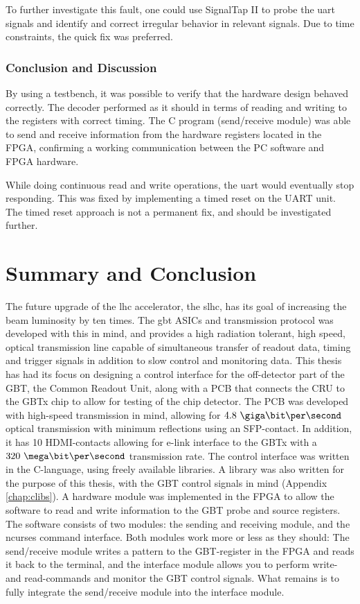 \documentclass[main.tex]{subfiles}
\begin{document}
To further investigate this fault, one could use SignalTap II to probe the \gls{uart} signals and identify and correct irregular behavior in relevant signals. Due to time constraints, the quick fix was preferred.

\subsection{Conclusion and Discussion}

By using a testbench, it was possible to verify that the hardware design behaved correctly. The decoder performed as it should in terms of reading and writing to the registers with correct timing. The C program (send/receive module) was able to send and receive information from the hardware registers located in the FPGA, confirming a working communication between the PC software and FPGA hardware.  

 While doing continuous read and write operations, the \gls{uart} would eventually stop responding. This was fixed by implementing a timed reset on the UART unit. The timed reset approach is not a permanent fix, and should be investigated further. 

\chapter{Summary and Conclusion} \label{chap:conc}

The future upgrade of the \acrlong{lhc} accelerator, the \acrlong{slhc}, has its goal of increasing the beam luminosity by ten times. The \acrlong{gbt} ASICs and transmission protocol was developed with this in mind, and provides a high radiation tolerant, high speed, optical transmission line capable of simultaneous transfer of readout data, timing and trigger signals in addition to slow control and monitoring data. This thesis has had its focus on designing a control interface for the off-detector part of the GBT, the Common Readout Unit, along with a PCB that connects the CRU to the GBTx chip to allow for testing of the chip detector. The PCB was developed with high-speed transmission in mind, allowing for $4.8~\giga\bit\per\second$ optical transmission with minimum reflections using an SFP-contact. In addition, it has 10 HDMI-contacts allowing for e-link interface to the GBTx with a $320~\mega\bit\per\second$ transmission rate. The control interface was written in the C-language, using freely available libraries. A library was also written for the purpose of this thesis, with the GBT control signals in mind (Appendix \ref{chap:clibs}). A hardware module was implemented in the FPGA to allow the software to read and write information to the GBT probe and source registers. The software consists of two modules: the sending and receiving module, and the ncurses command interface. Both modules work more or less as they should: The send/receive module writes a pattern to the GBT-register in the FPGA and reads it back to the terminal, and the interface module allows you to perform write- and read-commands and monitor the GBT control signals. What remains is to fully integrate the send/receive module into the interface module.
\end{document}

